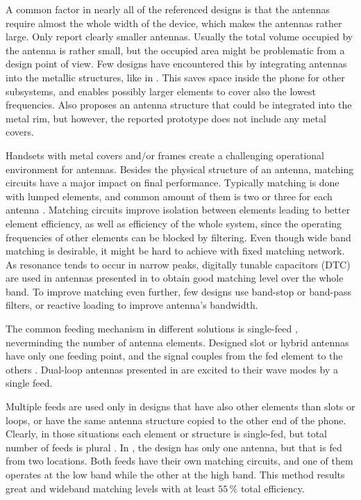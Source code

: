 A common factor in nearly all of the referenced designs is that the antennas require almost the whole width of the device, which makes the antennas rather large. Only \cite{wu_pier,wu_tunable} report clearly smaller antennas. Usually the total volume occupied by the antenna is rather small, but the occupied area might be problematic from a design point of view. Few designs have encountered this by integrating antennas into the metallic structures, like in \cite{chen_metal_frame,lee_monopole,wu_tunable,zhong_pier}. This saves space inside the phone for other subsystems, and enables possibly larger elements to cover also the lowest frequencies. Also \cite{valkonen_multifeed} proposes an antenna structure that could be integrated into the metal rim, but however, the reported prototype does not include any metal covers.

Handsets with metal covers and/or frames create a challenging operational environment for antennas. Besides the physical structure of an antenna, matching circuits have a major impact on final performance. Typically matching is done with lumped elements, and common amount of them is two or three for each antenna \cite{stanley_lte_mimo, zhong_pier, wu_pier}. Matching circuits improve isolation between elements leading to better element efficiency, as well as efficiency of the whole system, since the operating frequencies of other elements can be blocked by filtering. Even though wide band matching is desirable, it might be hard to achieve with fixed matching network. As resonance tends to occur in narrow peaks, digitally tunable capacitors (DTC) are used in antennas presented in \cite{chen_compact_lte,wu_tunable} to obtain good matching level over the whole band. To improve matching even further, few designs use band-stop \cite{lee_monopole, wu_pier} or band-pass \cite{chen_metal_frame} filters, or reactive loading \cite{chen_compact_lte, chen_metal_frame} to improve antenna's bandwidth.

The common feeding mechanism in different solutions is single-feed \cite{wu_tunable, chen_metal_frame, lee_monopole, chen_compact_lte,hepta_ifa}, neverminding the number of antenna elements. Designed slot or hybrid antennas have only one feeding point, and the signal couples from the fed element to the others \cite{son_wideband_mimo,hsu_compact,zhong_pier,yuan_slot}. Dual-loop antennas presented in \cite{stanley_lte_mimo,ban_dual_loop,hybrid} are excited to their wave modes by a single feed.

Multiple feeds are used only in designs that have also other elements than slots or loops, or have the same antenna structure copied to the other end of the phone. Clearly, in those situations each element or structure is single-fed, but total number of feeds is plural \cite{stanley_lte_mimo, son_wideband_mimo,reconf_narrow}. In \cite{valkonen_multifeed}, the design has only one antenna, but that is fed from two locations. Both feeds have their own matching circuits, and one of them operates at the low band while the other at the high band. This method results great and wideband matching levels with at least $55\,\%$ total efficiency.


